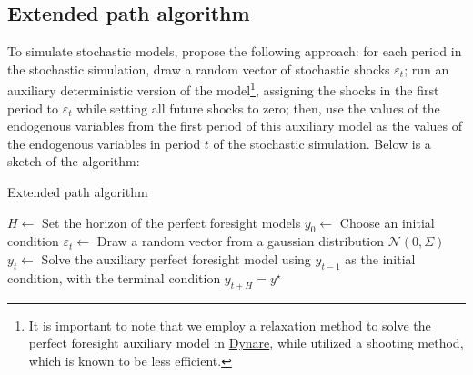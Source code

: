 \documentclass[a4paper,11pt]{amsart}
\newcommand{\Dynare}{\href{http://www.dynare.org}{Dynare}}
\begin{document}
\subsection{Extended path algorithm}

To simulate stochastic models, \textcite{FairTaylor1983} propose the
following approach: for each period in the stochastic simulation, draw
a random vector of stochastic shocks \(\varepsilon_t\); run an
auxiliary deterministic version of the model\footnote{It is important
   to note that we employ a relaxation method to solve the perfect
   foresight auxiliary model in \Dynare, while
   \textcite{FairTaylor1983} utilized a shooting method, which is known
   to be less efficient.}, assigning the shocks in the first period
to \(\varepsilon_t\) while setting all future shocks to zero; then,
use the values of the endogenous variables from the first period of
this auxiliary model as the values of the endogenous variables in
period \(t\) of the stochastic simulation. Below is a sketch of the
algorithm:\newline

\begin{algorithm}[H]
   \caption{Extended path algorithm}
   \label{alg:ep}
   \begin{algorithmic}[1]
      \STATE $H \leftarrow$ Set the horizon of the perfect foresight models
      \STATE $y_0 \leftarrow$ Choose an initial condition
      \STATE $\varepsilon_t \leftarrow$ Draw a random vector from a gaussian distribution  $\mathcal N\left(0, \Sigma\right)$
      \STATE $y_t \leftarrow$ Solve the auxiliary perfect foresight model using \(y_{t-1}\) as the initial condition, with the terminal condition \(y_{t+H} = y^{\star}\)
      \ENDFOR
   \end{algorithmic}
\end{algorithm}

\smallskip\smallskip
\end{document}
